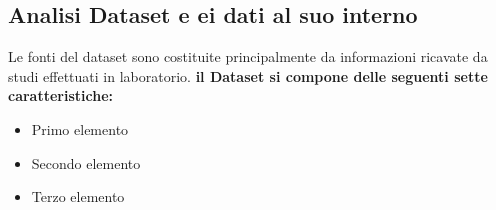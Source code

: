 \subsection{Analisi Dataset e ei dati al suo interno}
\fancyhead{}    %
\par{
Le fonti del dataset sono costituite principalmente da informazioni ricavate da studi effettuati in laboratorio.
\textbf{il Dataset si compone delle seguenti sette caratteristiche:}\newline
\begin{itemize}
  \item Primo elemento
  \item Secondo elemento
  \item Terzo elemento
\end{itemize}
}